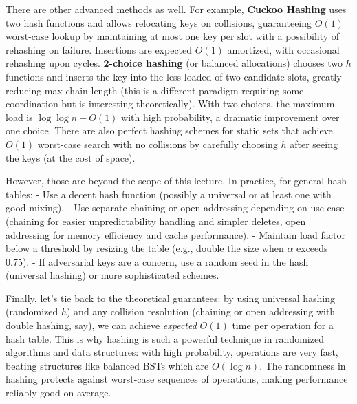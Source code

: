 \documentclass[11pt]{article}
\begin{document}
There are other advanced methods as well. For example, \textbf{Cuckoo Hashing} uses two hash functions and allows relocating keys on collisions, guaranteeing $O(1)$ worst-case lookup by maintaining at most one key per slot with a possibility of rehashing on failure. Insertions are expected $O(1)$ amortized, with occasional rehashing upon cycles. \textbf{2-choice hashing} (or balanced allocations) chooses two $h$ functions and inserts the key into the less loaded of two candidate slots, greatly reducing max chain length (this is a different paradigm requiring some coordination but is interesting theoretically). With two choices, the maximum load is $\log\log n + O(1)$ with high probability, a dramatic improvement over one choice. There are also perfect hashing schemes for static sets that achieve $O(1)$ worst-case search with no collisions by carefully choosing $h$ after seeing the keys (at the cost of space).

However, those are beyond the scope of this lecture. In practice, for general hash tables:
- Use a decent hash function (possibly a universal or at least one with good mixing).
- Use separate chaining or open addressing depending on use case (chaining for easier unpredictability handling and simpler deletes, open addressing for memory efficiency and cache performance).
- Maintain load factor below a threshold by resizing the table (e.g., double the size when $\alpha$ exceeds 0.75).
- If adversarial keys are a concern, use a random seed in the hash (universal hashing) or more sophisticated schemes.

Finally, let’s tie back to the theoretical guarantees: by using universal hashing (randomized $h$) and any collision resolution (chaining or open addressing with double hashing, say), we can achieve \emph{expected} $O(1)$ time per operation for a hash table. This is why hashing is such a powerful technique in randomized algorithms and data structures: with high probability, operations are very fast, beating structures like balanced BSTs which are $O(\log n)$. The randomness in hashing protects against worst-case sequences of operations, making performance reliably good on average.
\end{document}
